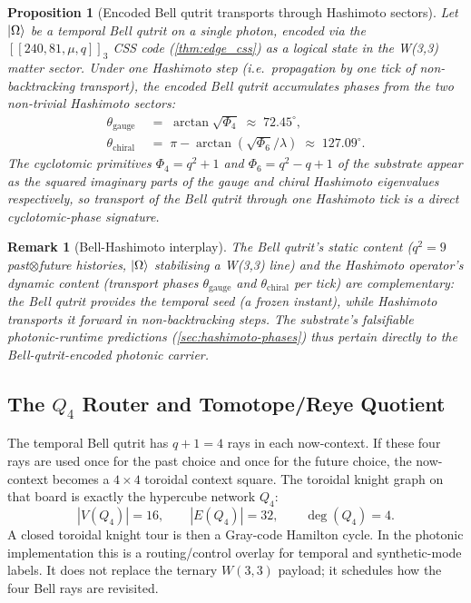 ﻿\documentclass[12pt]{article}
\newtheorem{proposition}[theorem]{Proposition}
\newtheorem{remark}[theorem]{Remark}
\begin{document}
\begin{proposition}[Encoded Bell qutrit transports through Hashimoto sectors]\label{prop:bell_hashimoto}
Let $\ket{\Omega}$ be a temporal Bell qutrit on a single photon, encoded
via the $[[240, 81, \mu, q]]_3$ CSS code (\cref{thm:edge_css}) as a
logical state in the W(3,3) matter sector.  Under one Hashimoto step
(i.e.\ propagation by one tick of non-backtracking transport), the encoded
Bell qutrit accumulates phases from the two non-trivial Hashimoto sectors:
\begin{align}
  \theta_{\mathrm{gauge}}   &\;=\; \arctan\sqrt{\Phi_4}
    \;\approx\; 72.45^{\circ}, \\
  \theta_{\mathrm{chiral}}  &\;=\; \pi - \arctan(\sqrt{\Phi_6}/\lambda)
    \;\approx\; 127.09^{\circ}.
\end{align}
The cyclotomic primitives $\Phi_4 = q^2 + 1$ and $\Phi_6 = q^2 - q + 1$
of the substrate appear as the squared imaginary parts of the gauge and
chiral Hashimoto eigenvalues respectively, so transport of the Bell qutrit
through one Hashimoto tick is a direct cyclotomic-phase signature.
\end{proposition}

\begin{remark}[Bell-Hashimoto interplay]
The Bell qutrit's \emph{static} content ($q^2 = 9$ past$\otimes$future
histories, $\ket{\Omega}$ stabilising a W(3,3) line) and the Hashimoto
operator's \emph{dynamic} content (transport phases $\theta_{\mathrm{gauge}}$
and $\theta_{\mathrm{chiral}}$ per tick) are complementary: the Bell
qutrit provides the temporal seed (a frozen instant), while Hashimoto
transports it forward in non-backtracking steps.  The substrate's
falsifiable photonic-runtime predictions
(\cref{sec:hashimoto-phases}) thus pertain directly to the
Bell-qutrit-encoded photonic carrier.
\end{remark}

\subsection{The $Q_4$ Router and Tomotope/Reye Quotient}
\label{sec:q4-router}

The temporal Bell qutrit has $q+1=4$ rays in each now-context.  If these
four rays are used once for the past choice and once for the future
choice, the now-context becomes a $4\times4$ toroidal context square.  The
toroidal knight graph on that board is exactly the hypercube network
$Q_4$:
\[
  |V(Q_4)|=16,\qquad |E(Q_4)|=32,\qquad \deg(Q_4)=4.
\]
A closed toroidal knight tour is then a Gray-code Hamilton cycle.  In the
photonic implementation this is a routing/control overlay for temporal and
synthetic-mode labels.  It does not replace the ternary $W(3,3)$ payload;
it schedules how the four Bell rays are revisited.
\end{document}
